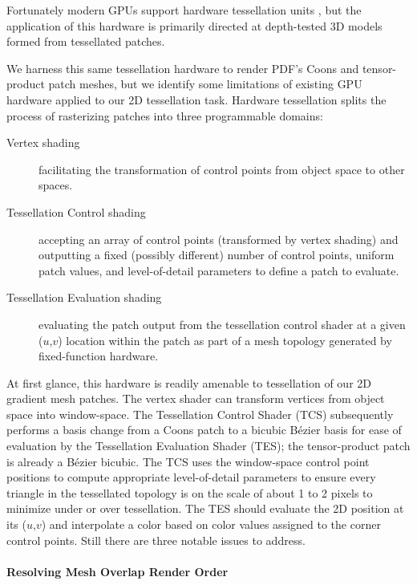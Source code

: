 Fortunately modern GPUs support hardware tessellation units \cite{schaefer2014star}, but the application
of this hardware is primarily directed at depth-tested 3D models formed from tessellated patches.

We harness this same tessellation hardware to render PDF's Coons and tensor-product patch meshes, but we
identify some limitations of existing GPU hardware applied to our 2D tessellation task.
Hardware tessellation splits the process of rasterizing patches into
three programmable domains:
\begin{description}
\item[Vertex shading] facilitating the transformation of control points from object space to other spaces.
\item[Tessellation Control shading] accepting an array of control points (transformed by vertex shading) and outputting a fixed (possibly different) number
of control points, uniform patch values, and level-of-detail parameters to define a patch to evaluate.
\item[Tessellation Evaluation shading] evaluating the patch output from the tessellation control shader at a given ($u$,$v$) location within the patch as part of a mesh topology generated by fixed-function hardware.
\end{description}
At first glance, this hardware is readily amenable to tessellation of our 2D gradient mesh patches.
The vertex shader can transform vertices from object space into window-space.  The Tessellation Control Shader (TCS)
subsequently performs
a basis change from a Coons patch to a bicubic B\'{e}zier basis for ease of evaluation by the Tessellation Evaluation Shader (TES); the tensor-product patch is already a B\'{e}zier bicubic.  The TCS uses the window-space control point positions to compute
appropriate level-of-detail parameters to ensure every triangle in the tessellated topology is on the scale of about 1 to 2 pixels to minimize under or over tessellation.
The TES should evaluate the 2D position at its ($u$,$v$)
and interpolate a color based on color values assigned to the corner control points.  Still there are three
notable issues to address.

\paragraph{Resolving Mesh Overlap Render Order}

